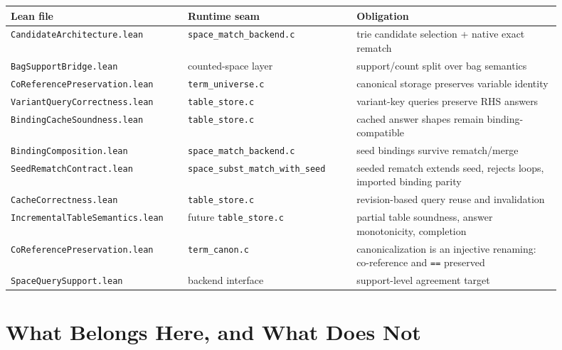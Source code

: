 \documentclass[11pt]{article}
\newcommand{\code}[1]{\texttt{#1}}
\begin{document}
\begin{center}
\begin{tabular}{@{}p{0.28\linewidth}p{0.28\linewidth}p{0.34\linewidth}@{}}
\toprule
\textbf{Lean file} & \textbf{Runtime seam} & \textbf{Obligation} \\
\midrule
\code{CandidateArchitecture.lean} & \code{space\_match\_backend.c} & trie candidate selection + native exact rematch \\
\code{BagSupportBridge.lean} & counted-space layer & support/count split over bag semantics \\
\code{CoReferencePreservation.lean} & \code{term\_universe.c} & canonical storage preserves variable identity \\
\code{VariantQueryCorrectness.lean} & \code{table\_store.c} & variant-key queries preserve RHS answers \\
\code{BindingCacheSoundness.lean} & \code{table\_store.c} & cached answer shapes remain binding-compatible \\
\code{BindingComposition.lean} & \code{space\_match\_backend.c} & seed bindings survive rematch/merge \\
\code{SeedRematchContract.lean} & \code{space\_subst\_match\_with\_seed} & seeded rematch extends seed, rejects loops, imported binding parity \\
\code{CacheCorrectness.lean} & \code{table\_store.c} & revision-based query reuse and invalidation \\
\code{IncrementalTableSemantics.lean} & future \code{table\_store.c} & partial table soundness, answer monotonicity, completion \\
\code{CoReferencePreservation.lean} & \code{term\_canon.c} & canonicalization is an injective renaming: co-reference and \code{==} preserved \\
\code{SpaceQuerySupport.lean} & backend interface & support-level agreement target \\
\bottomrule
\end{tabular}
\end{center}

\section{What Belongs Here, and What Does Not}
\end{document}
